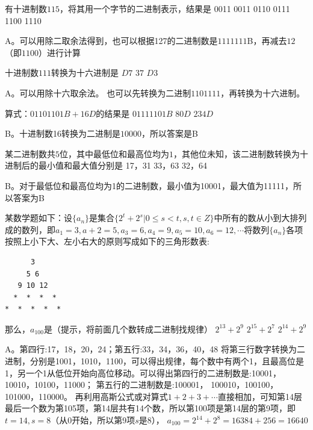 \begin{groups}
\begin{questions}[rp]
\question
{}有十进制数$115$，将其用一个字节的二进制表示，结果是
{0011 0011}
{0110 0111}
{1100 1110}
\begin{solution}
A。可以用除二取余法得到，也可以根据127的二进制数是$1111111$B，再减去$12$（即$1100$）进行计算
\end{solution}

\question
{}十进制数$111$转换为十六进制是
{$D7$}
{$37$}
{$D3$}
\begin{solution}
A。可以用除十六取余法。
也可以先转换为二进制$1101111$，再转换为十六进制。
\end{solution}

\question
{}算式：$0110 1101B + 16D$的结果是
{$0111 1101B$}
{$80D$}
{$234D$}
\begin{solution}
B。十进制数16转换为二进制是$10000$，所以答案是B
\end{solution}

\question
{}某二进制数共$5$位，其中最低位和最高位均为$1$，其他位未知，该二进制数转换为十进制后的最小值和最大值分别是
{17，31}
{33，63}
{32，64}
\begin{solution}
B。对于最低位和最高位均为1的二进制数，最小值为10001，最大值为11111，所以答案为B
\end{solution}

\question
{}某数学题如下：设$\{a_n\}$是集合$\{2^t+2^s | 0 \le s<t, s,t\in Z\}$中所有的数从小到大排列成的数列，即$a_1=3, a+2=5, a_3=6, a_4=9, a_5=10, a_6=12, \cdots$将数列$\{a_n\}$各项按照上小下大、左小右大的原则写成如下的三角形数表:
\begin{lstlisting}
      3
     5 6
   9 10 12
  *  *  *  *
*  *  *  *  *
\end{lstlisting}
那么，$a_{100}$是（提示，将前面几个数转成二进制找规律）
{$2^{13} + 2^{9}$}
{$2^{15} + 2^{7}$}
{$2^{14} + 2^{9}$}
\begin{solution}
A。第四行:17，18，20，24；第五行:33，34，36，40，48
将第三行数字转换为二进制，分别是1001，1010，1100，可以得出规律，每个数中有两个1，且最高位是1，另一个1从低位开始向高位移动。可以得出第四行的二进制数是:10001， 10010，10100，11000；
第五行的二进制数是:100001， 100010，100100，101000，110000。
再利用高斯公式或对算式$1+2+3+\cdots$直接相加，可知第14层最后一个数为第105项，第14层共有14个数，所以第100项是第14层的第9项，即$t=14,s=8$（从0开始，所以第9项$s$是8）， $a_{100} = 2^{14}+2^8=16384+256= 16640$
\end{solution}


\end{questions}
\end{groups}

